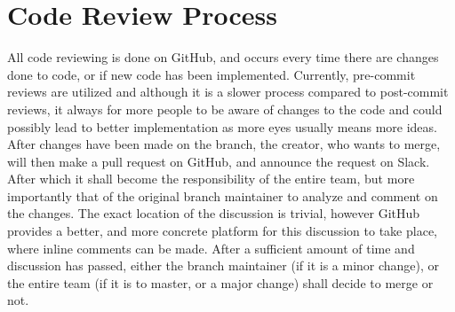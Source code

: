 \documentclass[12pt]{article}
\begin{document}
  \center\section{Code Review Process}
  \flushleft
All code reviewing is done on GitHub, and occurs every time there are changes done to code, or if new code has been implemented. Currently, pre-commit reviews are utilized and although it is a slower process compared to post-commit reviews, it always for more people to be aware of changes to the code and could possibly lead to better implementation as more eyes usually means more ideas. \newline
After changes have been made on the branch, the creator, who wants to merge, will then make a pull request on GitHub, and announce the request on Slack. After which it shall become the responsibility of the entire team, but more importantly that of the original branch maintainer to analyze and comment on the changes. The exact location of the discussion is trivial, however GitHub provides a better, and more concrete platform for this discussion to take place, where inline comments can be made. After a sufficient amount of time and discussion has passed, either the branch maintainer (if it is a minor change), or the entire team (if it is to master, or a major change) shall decide to merge or not.

  
\end{document}
